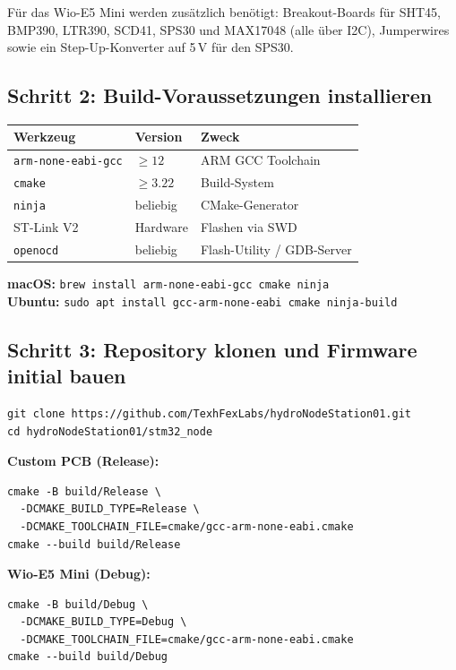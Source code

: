 \documentclass[11pt,a4paper]{scrartcl}
\begin{document}
Für das Wio-E5 Mini werden zusätzlich benötigt: Breakout-Boards für SHT45, BMP390, LTR390, SCD41, SPS30 und MAX17048 (alle über I2C), Jumperwires sowie ein Step-Up-Konverter auf 5\,V für den SPS30.

\subsection*{Schritt 2: Build-Voraussetzungen installieren}

\begin{table}[H]
  \centering
  \begin{tabular}{lll}
    \hline
    \textbf{Werkzeug} & \textbf{Version} & \textbf{Zweck} \\
    \hline
    \texttt{arm-none-eabi-gcc} & $\geq 12$ & ARM GCC Toolchain \\
    \texttt{cmake}             & $\geq 3.22$ & Build-System \\
    \texttt{ninja}             & beliebig & CMake-Generator \\
    ST-Link V2                 & Hardware & Flashen via SWD \\
    \texttt{openocd}           & beliebig & Flash-Utility / GDB-Server \\
    \hline
  \end{tabular}
\end{table}

\textbf{macOS:} \quad\texttt{brew install arm-none-eabi-gcc cmake ninja}\\
\textbf{Ubuntu:} \quad\texttt{sudo apt install gcc-arm-none-eabi cmake ninja-build}

\subsection*{Schritt 3: Repository klonen und Firmware initial bauen}

\begin{verbatim}
git clone https://github.com/TexhFexLabs/hydroNodeStation01.git
cd hydroNodeStation01/stm32_node
\end{verbatim}

\textbf{Custom PCB (Release):}
\begin{verbatim}
cmake -B build/Release \
  -DCMAKE_BUILD_TYPE=Release \
  -DCMAKE_TOOLCHAIN_FILE=cmake/gcc-arm-none-eabi.cmake
cmake --build build/Release
\end{verbatim}

\textbf{Wio-E5 Mini (Debug):}
\begin{verbatim}
cmake -B build/Debug \
  -DCMAKE_BUILD_TYPE=Debug \
  -DCMAKE_TOOLCHAIN_FILE=cmake/gcc-arm-none-eabi.cmake
cmake --build build/Debug
\end{verbatim}
\end{document}
